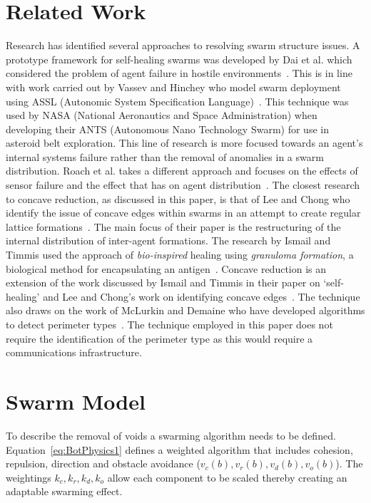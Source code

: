 \documentclass{ieeeaccess}
\begin{document}
\section{Related Work}\label{sec:RelatedWork}
Research has identified several approaches to resolving swarm structure issues. A prototype framework for self-healing swarms was developed by Dai et al. which considered the problem of agent failure in hostile environments~\cite{DHMRZ:06}. This is in line with work carried out by Vassev and Hinchey who model swarm deployment using ASSL (Autonomic System Specification Language)~\cite{VH:09}. This technique was used by NASA (National Aeronautics and Space Administration) when developing their ANTS (Autonomous Nano Technology Swarm) for use in asteroid belt exploration. This line of research is more focused towards an agent's internal systems failure rather than the removal of anomalies in a swarm distribution. Roach et al. takes a different approach and focuses on the effects of sensor failure and the effect that has on agent distribution~\cite{RMT:15}. The closest research to concave reduction, as discussed in this paper, is that of Lee and Chong who identify the issue of concave edges within swarms in an attempt to create regular lattice formations~\cite{GN:08}. The main focus of their paper is the restructuring of the internal distribution of inter-agent formations. The research by Ismail and Timmis used the approach of \textit{bio-inspired} healing using \textit{granuloma formation}, a biological method for encapsulating an antigen~\cite{IT:10}.
Concave reduction is an extension of the work discussed by Ismail and Timmis in their paper on `self-healing' \cite{IT:10} and Lee and Chong's work on identifying concave edges~\cite{GN:08}. The technique also draws on the work of McLurkin and Demaine who have developed algorithms to detect perimeter types~\cite{MD:09}. The technique employed in this paper does not require the identification of the perimeter type as this would require a communications infrastructure.

\section{Swarm Model}\label{sec:Swarm Model}
To describe the removal of voids a swarming algorithm needs to be defined. Equation~\ref{eq:BotPhysics1} defines a weighted algorithm that includes cohesion, repulsion, direction and obstacle avoidance ($v_c(b), v_r(b), v_d(b), v_o(b)$). The weightings $k_c, k_r, k_d, k_o$ allow each component to be scaled thereby creating an adaptable swarming effect. 
\end{document}
